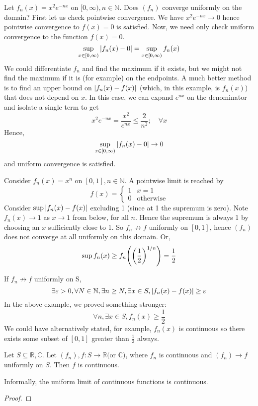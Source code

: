 \begin{example}
Let \( f_n(x) = x^2 e^{-nx} \) on \( [0, \infty), n \in \mathbb N \).
Does \( (f_n) \) converge uniformly on the domain?
First let us check pointwise convergence.
We have \( x^2 e^{-nx} \to 0 \) hence pointwise convergence to \( f(x) = 0 \) is satisfied.
Now, we need only check uniform convergence to the function \( f(x) = 0 \).
\[ \sup_{x \in [0, \infty)} \abs{f_n(x) - 0} = \sup_{x \in [0, \infty)} f_n(x) \]
We could differentiate \( f_n \) and find the maximum if it exists, but we might not find the maximum if it is (for example) on the endpoints.
A much better method is to find an upper bound on \( \abs{f_n(x)-f(x)} \) (which, in this example, is \( f_n(x) \)) that does not depend on \( x \).
In this case, we can expand \( e^{nx} \) on the denominator and isolate a single term to get
\[ x^2 e^{-nx} = \frac{x^2}{e^{nx}} \leq \frac{2}{n^2};\quad \forall x \]
Hence,
\[ \sup_{x \in [0, \infty)} \abs{f_n(x) - 0} \to 0 \]
and uniform convergence is satisfied.
\end{example}
\begin{example}
Consider \( f_n(x) = x^n \) on \( [0,1], n \in \mathbb N \).
A pointwise limit is reached by
\[ f(x) = \begin{cases}
    1 & x = 1 \\
    0 & \text{otherwise}
\end{cases} \]
Consider \( \sup \abs{f_n(x) - f(x)} \) excluding 1 (since at 1 the supremum is zero).
Note \( f_n(x) \to 1 \) as \( x \to 1 \) from below, for all \( n \).
Hence the supremum is always 1 by choosing an \( x \) sufficiently close to 1.
So \( f_n \not\to f \) uniformly on \( [0,1] \), hence \( (f_n) \) does not converge at all uniformly on this domain.
Or,
\[ \sup f_n(x) \geq f_n\qty(\qty(\frac{1}{2})^{1/n}) = \frac{1}{2} \]
\end{example}

\begin{remark}
If \(f_n \not\to f\) uniformly on S,
\[ \exists \varepsilon > 0, \forall N \in \mathbb N, \exists n \geq N, \exists x \in S, \abs{f_n(x) - f(x)} \geq \varepsilon \]
In the above example, we proved something stronger:
\[ \forall n, \exists x \in S, f_n(x) \geq \frac{1}{2} \]
We could have alternatively stated, for example, \( f_n(x) \) is continuous so there exists some subset of \( [0, 1] \) greater than \( \frac{1}{2} \) always.
\end{remark}

\begin{theorem}
Let \( S \subseteq \mathbb R, \mathbb C \).
Let \( (f_n), f \colon S \to \mathbb R \text{(or } \mathbb{C} \text{)} \), where \( f_n \) is continuous and \( (f_n) \to f \) uniformly on \( S \).
Then \( f \) is continuous.
\end{theorem}
\noindent Informally, the uniform limit of continuous functions is continuous.
\begin{proof}

\end{proof}
